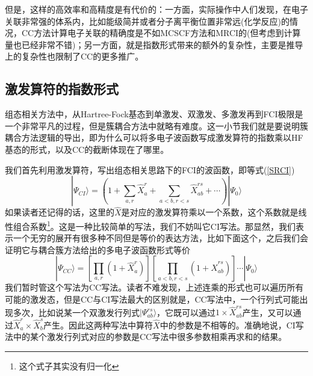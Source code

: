 \documentclass[12pt,a4paper,openany,twoside]{book}
\numberwithin{equation}{section}
\begin{document}
          但是，这样的高效率和高精度是有代价的：一方面，实际操作中人们发现，在电子关联非常强的体系内，比如能级简并或者分子离平衡位置非常远(化学反应)的情况，CC方法计算电子关联的精确度是不如MCSCF方法和MRCI的(但考虑到计算量也已经非常不错)；另一方面，就是指数形式带来的额外的复杂性，主要是推导上的复杂性也限制了CC的更多推广。
        \subsection{激发算符的指数形式}
          组态相关方法中，从Hartree-Fock基态到单激发、双激发、多激发再到FCI极限是一个非常平凡的过程，但是簇耦合方法中就略有难度。这一小节我们就是要说明簇耦合方法逻辑的导出，即为什么可以将多电子波函数写成激发算符的指数乘以HF基态的形式，以及CC的截断体现在了哪里。

          我们首先利用激发算符，写出组态相关思路下的FCI的波函数，即等式(\ref{SRCI})
          \begin{equation}
            | \Psi_{CI} \rangle = \left(1+\sum_{a,r}\hat{X}_{a}^{r}+\sum_{a<b,r<s}\hat{X}_{ab}^{rs}+\cdots\right) | \Psi_0 \rangle
          \end{equation}
          如果读者还记得的话，这里的$\hat{X}$是对应的激发算符乘以一个系数，这个系数就是线性组合系数\footnote{这个式子其实没有归一化}。这是一种比较简单的写法，我们不妨叫它CI写法。那显然，我们表示一个无穷的展开有很多种不同但是等价的表达方法，比如下面这个，之后我们会证明它与耦合簇方法给出的多电子波函数形式等价
          \begin{equation}
            |\Psi_{CC}\rangle=\left[\prod_{a,r}\left(1+\hat{X}_{a}^{r}\right)\right]\left[\prod_{a<b, r<s}\left(1+\hat{X}_{ab}^{rs}\right)\right] \cdots|\Psi_{0}\rangle
          \end{equation}
          我们暂时管这个写法为CC写法。读者不难发现，上述连乘的形式也可以遍历所有可能的激发态，但是CC与CI写法最大的区别就是，CC写法中，一个行列式可能出现多次，比如说某一个双激发行列式$ | \Psi_{ab}^{rs} \rangle $，它既可以通过$1\times\hat{X}_{ab}^{rs}$产生，又可以通过$\hat{X}_a^r\times\hat{X}_b^s$产生。因此这两种写法中算符$\hat{X}$中的参数是不相等的。准确地说，CI写法中的某个激发行列式对应的参数是CC写法中很多参数相乘再求和的结果。
\end{document}
